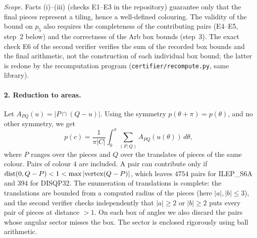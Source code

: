 \documentclass[10pt,a4paper]{article}
\begin{document}
\emph{Scope.} Facts (i)--(iii) (checks E1--E3 in the repository) guarantee only that the final pieces
represent a tiling, hence a well-defined colouring. The validity of the bound on $p_5$ also requires the
completeness of the contributing pairs (E4--E5, step~2 below) and the correctness of the Arb box bounds
(step~3). The exact check E6 of the second verifier verifies the sum of the recorded box bounds and the final
arithmetic, not the construction of each individual box bound; the latter is redone by the recomputation
program (\texttt{certifier/recompute.py}, same library).

\paragraph{2. Reduction to areas.} Let $A_{PQ}(u)=|P\cap(Q-u)|$. Using the symmetry
$p(\theta+\pi)=p(\theta)$, and no other symmetry, we get
\[ p(c)=\frac{1}{\pi|C|}\int_0^\pi\sum_{(P,Q)}A_{PQ}(u(\theta))\,d\theta, \]
where $P$ ranges over the pieces and $Q$ over the translates of pieces of the same colour.
Pairs of colour $4$ are included. A pair can contribute only if $\operatorname{dist}(0,Q-P)<1<
\max|{\rm vertex}(Q-P)|$, which leaves $4754$ pairs for ILEP\_S6A and $394$ for DISQP32. The enumeration of
translations is complete: the translations are bounded from a computed radius of the pieces
(here $|a|,|b|\le3$), and the second verifier checks independently that $|a|\ge2$ or $|b|\ge2$ puts every
pair of pieces at distance $>1$. On each box of angles we also discard the pairs whose angular sector misses
the box. The sector is enclosed rigorously using ball arithmetic.
\end{document}
